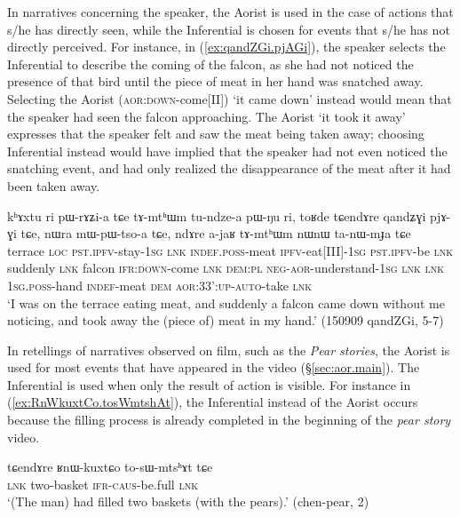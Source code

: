 In narratives concerning the speaker, the Aorist is used in the case of actions that s/he has directly seen, while the Inferential is chosen for events that s/he has not directly perceived. For instance, in (\ref{ex:qandZGi.pjAGi}), the speaker selects the Inferential  to describe the coming of the falcon, as she had not noticed the presence of that bird until the piece of meat in her hand was snatched away. Selecting the Aorist  (\textsc{aor}:\textsc{down}-come[II]) `it came down' instead would mean that the speaker had seen the falcon approaching.  The Aorist  `it took it away' expresses that the speaker felt and saw the meat being taken away; choosing  Inferential  instead would have implied that the speaker had not even noticed the snatching event, and had only realized the disappearance of the meat after it had been taken away.


\begin{exe}
\ex \label{ex:qandZGi.pjAGi}
\gll   kʰɤxtu ri pɯ-rɤʑi-a tɕe tɤ-mtʰɯm tu-ndze-a pɯ-ŋu ri, toʁde tɕendɤre qandʑɣi pjɤ-ɣi tɕe, nɯra mɯ-pɯ-tso-a tɕe, ndɤre a-jaʁ tɤ-mtʰɯm nɯnɯ ta-nɯ-mɟa tɕe \\
terrace \textsc{loc} \textsc{pst}.\textsc{ipfv}-stay-\textsc{1sg} \textsc{lnk} \textsc{indef}.\textsc{poss}-meat \textsc{ipfv}-eat[III]-\textsc{1sg} \textsc{pst}.\textsc{ipfv}-be \textsc{lnk} suddenly \textsc{lnk} falcon \textsc{ifr}:\textsc{down}-come \textsc{lnk} \textsc{dem}:\textsc{pl} \textsc{neg}-\textsc{aor}-understand-\textsc{1sg} \textsc{lnk} \textsc{lnk} \textsc{1sg}.\textsc{poss}-hand \textsc{indef}-meat \textsc{dem} \textsc{aor}:3\fl{}3':\textsc{up}-\textsc{auto}-take \textsc{lnk} \\
\glt `I was on the terrace eating meat, and suddenly a falcon came down without me noticing, and took away the (piece of) meat in my hand.' (150909 qandZGi, 5-7)
 \end{exe}



In retellings of narratives observed on film, such as the \textit{Pear stories}, the Aorist is used for most events that have appeared in the video (§\ref{sec:aor.main}). The Inferential is used when only the result of action is visible. For instance in (\ref{ex:RnWkuxtCo.tosWmtshAt}), the Inferential  instead of the Aorist  occurs because the filling process is already completed in the beginning of the \textit{pear story} video.

\begin{exe}
\ex \label{ex:RnWkuxtCo.tosWmtshAt}
\gll tɕendɤre ʁnɯ-kuxtɕo to-sɯ-mtsʰɤt tɕe \\
\textsc{lnk} two-basket \textsc{ifr}-\textsc{caus}-be.full \textsc{lnk} \\
\glt `(The man) had filled two baskets (with the pears).' (chen-pear, 2)
 \end{exe}

